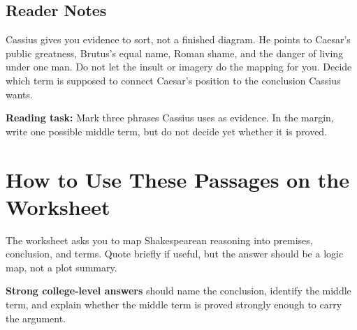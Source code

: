 \documentclass[12pt]{article}
\begin{document}
\subsection*{Reader Notes}

Cassius gives you evidence to sort, not a finished diagram. He points to Caesar's public greatness, Brutus's equal name, Roman shame, and the danger of living under one man. Do not let the insult or imagery do the mapping for you. Decide which term is supposed to connect Caesar's position to the conclusion Cassius wants.

\textbf{Reading task:} Mark three phrases Cassius uses as evidence. In the margin, write one possible middle term, but do not decide yet whether it is proved.

\section*{How to Use These Passages on the Worksheet}

The worksheet asks you to map Shakespearean reasoning into premises, conclusion, and terms. Quote briefly if useful, but the answer should be a logic map, not a plot summary.

\textbf{Strong college-level answers} should name the conclusion, identify the middle term, and explain whether the middle term is proved strongly enough to carry the argument.
\end{document}
